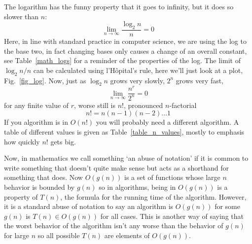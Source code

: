 \documentclass[11pt,a4paper]{scrartcl}
\begin{document}
The logarithm has the funny property that it goes to infinity, but it
does so slower than $n$:
\begin{equation}
\lim_{n\rightarrow \infty}\frac{\log_2{n}}{n}=0
\end{equation}
Here, in line with standard practice in computer science, we are using
the log to the base two, in fact changing bases only causes a change
of an overall constant, see Table~\ref{math_logs} for a reminder of
the properties of the log. The limit of $\log_2{n}/n$ can be calculated
using l'H\^{o}pital's rule, here we'll just look at a plot,
Fig.~\ref{fig_log}. Now, just as $\log_2{n}$ grows very slowly, $2^n$ grows very fast, 
\begin{equation}
\lim_{n\rightarrow \infty}\frac{n^r}{2^n}=0
\end{equation}
for any finite value of $r$, worse still is $n!$, pronounced $n$-factorial
\begin{equation}
n!=n(n-1)(n-2) . . . 1
\end{equation}
If you algorithm is in $O(n!)$ you will probably need a different
algorithm. A table of different values is given as
Table~\ref{table_n_values}, mostly to emphasis how quickly $n!$ gets
big.

Now, in mathematics we call something \lq{}an abuse of notation\rq{}
if it is common to write something that doesn't quite make sense but
acts as a shorthand for something that does. Now $O(g(n))$ is a set of
functions whose large $n$ behavior is bounded by $g(n)$ so in
algorithms, being in $O(g(n))$ is a property of $T(n)$, the formula
for the running time of the algorithm. However, it is a standard abuse
of notation to say an algorithm is $O(g(n))$ for some $g(n)$ is
$T(n)\in O(g(n))$ for all cases. This is another way of saying that
the worst behavior of the algorithm isn't any worse than the behavior
of $g(n)$ for large $n$ so all possible $T(n)$ are elements of
$O(g(n))$.
\end{document}
